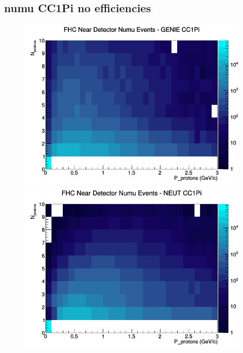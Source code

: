 \subsection{numu CC1Pi no efficiencies}
\begin{figure}[h]
\includegraphics[width=\linewidth]{N_P/nominal/protons/CC1Pi_FHC_ND_numu_N_P_GENIE.png}
\endminipage
{}
\includegraphics[width=\linewidth]{N_P/nominal/protons/CC1Pi_FHC_ND_numu_N_P_NEUT.png}
\endminipage
{}

\end{figure}
